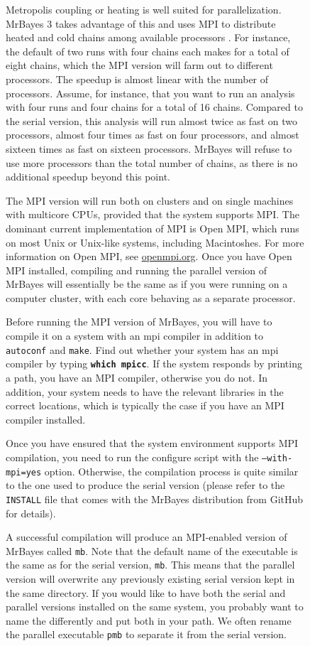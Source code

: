 \documentclass[12pt]{book}
\newcommand{\ttt}[1]{\texttt{#1}}
\newcommand{\tb}[1]{\ttt{\textbf{#1}}}
\begin{document}
\begin{figure}[h]
Metropolis coupling or heating is well suited for parallelization. MrBayes 3 takes advantage of
this and uses MPI to distribute heated and cold chains among available processors
\citep{altekar04}. For instance, the default of two runs with four chains each makes for a total of
eight chains, which the MPI version will farm out to different processors. The speedup is almost
linear with the number of processors. Assume, for instance, that you want to run an analysis with
four runs and four chains for a total of 16 chains. Compared to the serial version, this analysis
will run almost twice as fast on two processors, almost four times as fast on four processors, and
almost sixteen times as fast on sixteen processors. MrBayes will refuse to use more processors than
the total number of chains, as there is no additional speedup beyond this point.

The MPI version will run both on clusters and on single machines with multicore CPUs, provided that
the system supports MPI. The dominant current implementation of MPI is Open MPI, which runs on most
Unix or Unix-like systems, including Macintoshes. For more information on Open MPI, see
\url{openmpi.org}. Once you have Open MPI installed, compiling and running the parallel version of
MrBayes will essentially be the same as if you were running on a computer cluster, with each core
behaving as a separate processor.

Before running the MPI version of MrBayes, you will have to compile it on a system with an mpi
compiler in addition to \ttt{autoconf} and \ttt{make}. Find out whether your system has an mpi
compiler by typing \tb{which mpicc}. If the system responds by printing a path, you have an MPI
compiler, otherwise you do not. In addition, your system needs to have the relevant libraries in
the correct locations, which is typically the case if you have an MPI compiler installed.

Once you have ensured that the system environment supports MPI compilation, you need to run the
configure script with the \ttt{--with-mpi=yes} option. Otherwise, the compilation process is
quite similar to the one used to produce the serial version (please refer to the \ttt{INSTALL} file
that comes with the MrBayes distribution from GitHub for details).

A successful compilation will produce an MPI-enabled version of MrBayes called \ttt{mb}. Note that
the default name of the executable is the same as for the serial version, \ttt{mb}. This means that
the parallel version will overwrite any previously existing serial version kept in the same
directory. If you would like to have both the serial and parallel versions installed on the same
system, you probably want to name the differently and put both in your path. We often rename the
parallel executable \ttt{pmb} to separate it from the serial version.


\end{figure}
\end{document}
